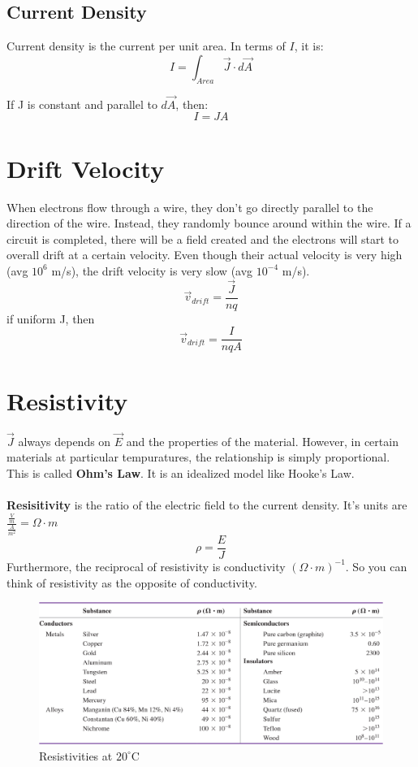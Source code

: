 \documentclass[10pt, a4paper, twocolumn]{article}
\begin{document}
        \subsection{Current Density}
            Current density is the current per unit area. In terms of $I$, it is:
            $$I = \int_{Area} \vec{J} \cdot d \vec{A}$$

            If J is constant and parallel to $d \vec{A}$, then:
            $$I = JA$$
    \section{Drift Velocity}
        When electrons flow through a wire, they don't go directly parallel to the direction of the wire. Instead, they randomly bounce around within the wire. If a circuit is completed, there will be a field created and the electrons will start to overall drift at a certain velocity. Even though their actual velocity is very high (avg $10^6$ m/s), the drift velocity is very slow (avg $10^{-4}$ m/s).
        $$\vec{v}_{drift} = \frac{\vec{J}}{nq}$$
        if uniform J, then\\
        $$\vec{v}_{drift} = \frac{I}{nqA}$$

    \section{Resistivity}	
        $\vec{J}$ always depends on $\vec{E}$ and the properties of the material. However, in certain materials at particular tempuratures, the relationship is simply proportional. This is called \textbf{Ohm's Law}. It is an idealized model like Hooke's Law.\\\\
        \textbf{Resisitivity} is the ratio of the electric field to the current density. It's units are $\frac{\frac{V}{m}}{\frac{A}{m^2}} = \Omega \cdot m$
        $$\rho = \frac{E}{J}$$ 
        Furthermore, the reciprocal of resistivity is conductivity $(\Omega \cdot m)^{-1}$. So you can think of resistivity as the opposite of conductivity.\\
        \begin{figure}[H]
            \includegraphics[width=\linewidth]{resistivities} %
            \caption{Resistivities at $20^{\circ}$C} %
        \end{figure}
        
\end{document}
